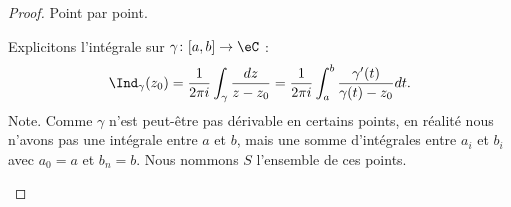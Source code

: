 \begin{proof}
	Point par point.
	\begin{subproof}

		Explicitons l'intégrale sur \(\gamma \colon \mathopen[ a,b\mathclose]\to \eC  \) :
		\begin{equation}
			\Ind_{\gamma}(z_0)=\frac{1}{ 2\pi i}\int_{\gamma}\frac{ dz }{ z-z_0 }=\frac{1}{ 2\pi i}\int_a^b\frac{ \gamma'(t) }{ \gamma(t)-z_0 }dt.
		\end{equation}
		Note. Comme \( \gamma\) n'est peut-être pas dérivable en certains points, en réalité nous n'avons pas une intégrale entre \( a\) et \( b\), mais une somme d'intégrales entre \( a_i\) et \( b_i\) avec \( a_0=a\) et \( b_n=b\). Nous nommons \( S\) l'ensemble de ces points.


\end{subproof}
\end{proof}
